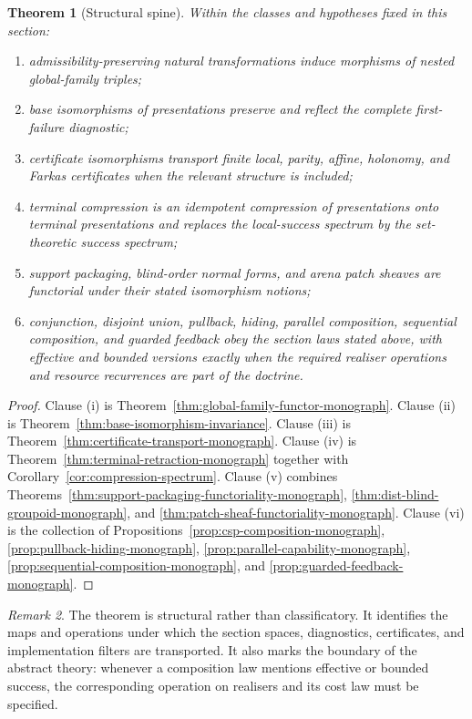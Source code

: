 \documentclass[11pt]{article}
\theoremstyle{plain}
\newtheorem{theorem}{Theorem}[section]
\theoremstyle{definition}
\theoremstyle{remark}
\newtheorem{remark}[theorem]{Remark}
\begin{document}
\begin{theorem}[Structural spine]
\label{thm:structural-spine}
Within the classes and hypotheses fixed in this section:
\begin{enumerate}[label=(\roman*)]
\item admissibility-preserving natural transformations induce morphisms of nested
global-family triples;
\item base isomorphisms of presentations preserve and reflect the complete
first-failure diagnostic;
\item certificate isomorphisms transport finite local, parity, affine, holonomy,
and Farkas certificates when the relevant structure is included;
\item terminal compression is an idempotent compression of presentations onto
terminal presentations and replaces the local-success spectrum by the
set-theoretic success spectrum;
\item support packaging, blind-order normal forms, and arena patch sheaves are
functorial under their stated isomorphism notions;
\item conjunction, disjoint union, pullback, hiding, parallel composition,
sequential composition, and guarded feedback obey the section laws stated above,
with effective and bounded versions exactly when the required realiser operations
and resource recurrences are part of the doctrine.
\end{enumerate}
\end{theorem}

\begin{proof}
Clause (i) is Theorem~\ref{thm:global-family-functor-monograph}. Clause (ii) is
Theorem~\ref{thm:base-isomorphism-invariance}. Clause (iii) is
Theorem~\ref{thm:certificate-transport-monograph}. Clause (iv) is
Theorem~\ref{thm:terminal-retraction-monograph} together with
Corollary~\ref{cor:compression-spectrum}. Clause (v) combines
Theorems~\ref{thm:support-packaging-functoriality-monograph},
\ref{thm:dist-blind-groupoid-monograph}, and
\ref{thm:patch-sheaf-functoriality-monograph}. Clause (vi) is the collection of
Propositions~\ref{prop:csp-composition-monograph},
\ref{prop:pullback-hiding-monograph}, \ref{prop:parallel-capability-monograph},
\ref{prop:sequential-composition-monograph}, and
\ref{prop:guarded-feedback-monograph}.
\end{proof}

\begin{remark}
The theorem is structural rather than classificatory. It identifies the maps and
operations under which the section spaces, diagnostics, certificates, and
implementation filters are transported. It also marks the boundary of the
abstract theory: whenever a composition law mentions effective or bounded
success, the corresponding operation on realisers and its cost law must be
specified.
\end{remark}
\end{document}
